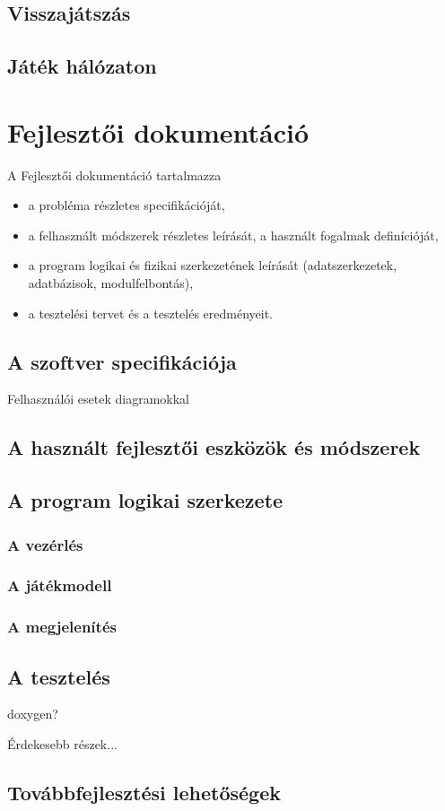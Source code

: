 \documentclass[12pt]{report}
\begin{document}
\section{Visszajátszás}

\section{Játék hálózaton}


\chapter{Fejlesztői dokumentáció}

A Fejlesztői dokumentáció tartalmazza 
\begin{itemize}
\item a probléma részletes specifikációját, 
\item a felhasznált módszerek részletes leírását, a használt fogalmak definícióját,
\item a program logikai és fizikai szerkezetének leírását (adatszerkezetek, adatbázisok, modulfelbontás),
\item a tesztelési tervet és a tesztelés eredményeit.
\end{itemize}

\section{A szoftver specifikációja}
Felhasználói esetek diagramokkal

\section{A használt fejlesztői eszközök és módszerek}

\section{A program logikai szerkezete}

\subsection{A vezérlés}

\subsection {A játékmodell}

\subsection{A megjelenítés}

\section{A tesztelés}

doxygen?

Érdekesebb részek...

\section{Továbbfejlesztési lehetőségek}
\end{document}
